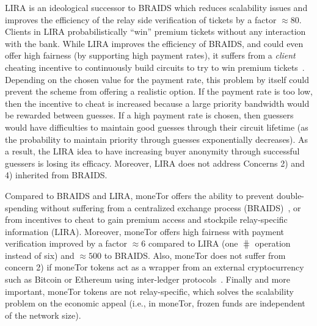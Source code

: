 LIRA is an ideological successor to BRAIDS which reduces scalability
issues and improves the efficiency of the relay side verification of
tickets by a factor $\approx 80$. Clients in LIRA probabilistically
``win'' premium tickets without any interaction with the bank. While
LIRA improves the efficiency of BRAIDS, and could even offer high
fairness (by supporting high payment rates), it suffers from a
\textit{client} cheating incentive to continuously build circuits to
try to win premium tickets~\cite{jansen2013lira,
  jansenblogpost}. Depending on the chosen value for the payment rate,
this problem by itself could prevent the scheme from offering a
realistic option. If the payment rate is too low, then the incentive
to cheat is increased because a large priority bandwidth would be
rewarded between guesses. If a high payment rate is chosen, then
guessers would have difficulties to maintain good guesses through
their circuit lifetime (as the probability to maintain priority
through guesses exponentially decreases). As a result, the LIRA idea
to have increasing buyer anonymity through successful guessers is
losing its efficacy. Moreover, LIRA does not address Concerns 2)
and 4) inherited from BRAIDS.

Compared to BRAIDS and LIRA, moneTor offers the ability to prevent
double-spending without suffering from a centralized exchange process
(BRAIDS)~\cite{jansenblogpost}, or from incentives to cheat to gain
premium access and stockpile relay-specific information
(LIRA). Moreover, moneTor offers high fairness with payment
verification improved by a factor $\approx 6$ compared to LIRA (one
$\hash$ operation instead of six) and $\approx 500$ to BRAIDS. Also,
moneTor does not suffer from concern 2) if moneTor tokens act as a
wrapper from an external cryptocurrency such as Bitcoin or Ethereum
using inter-ledger protocols~\cite{back2014enabling,
  poon2017plasma}.  Finally and more
important, moneTor tokens are not relay-specific, which solves the
scalability problem on the economic appeal (i.e., in moneTor, frozen
funds are independent of the network size).

